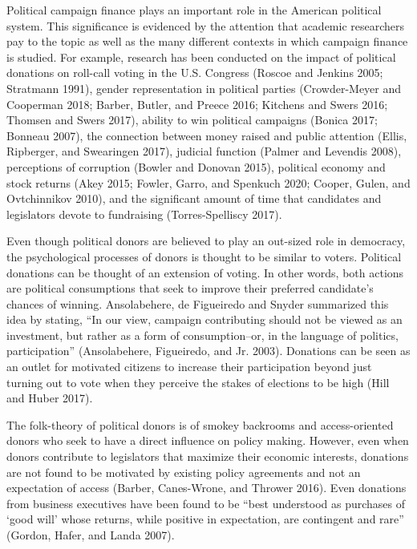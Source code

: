 \documentclass[12pt,]{article}
\begin{document}
\vskip -8.5pt



\noindent \doublespacing 

Political campaign finance plays an important role in the American
political system. This significance is evidenced by the attention that
academic researchers pay to the topic as well as the many different
contexts in which campaign finance is studied. For example, research has
been conducted on the impact of political donations on roll-call voting
in the U.S. Congress (Roscoe and Jenkins 2005; Stratmann 1991), gender
representation in political parties (Crowder-Meyer and Cooperman 2018;
Barber, Butler, and Preece 2016; Kitchens and Swers 2016; Thomsen and
Swers 2017), ability to win political campaigns (Bonica 2017; Bonneau
2007), the connection between money raised and public attention (Ellis,
Ripberger, and Swearingen 2017), judicial function (Palmer and Levendis
2008), perceptions of corruption (Bowler and Donovan 2015), political
economy and stock returns (Akey 2015; Fowler, Garro, and Spenkuch 2020;
Cooper, Gulen, and Ovtchinnikov 2010), and the significant amount of
time that candidates and legislators devote to fundraising
(Torres-Spelliscy 2017).

Even though political donors are believed to play an out-sized role in
democracy, the psychological processes of donors is thought to be
similar to voters. Political donations can be thought of an extension of
voting. In other words, both actions are political consumptions that
seek to improve their preferred candidate's chances of winning.
Ansolabehere, de Figueiredo and Snyder summarized this idea by stating,
``In our view, campaign contributing should not be viewed as an
investment, but rather as a form of consumption--or, in the language of
politics, participation'' (Ansolabehere, Figueiredo, and Jr. 2003).
Donations can be seen as an outlet for motivated citizens to increase
their participation beyond just turning out to vote when they perceive
the stakes of elections to be high (Hill and Huber 2017).

The folk-theory of political donors is of smokey backrooms and
access-oriented donors who seek to have a direct influence on policy
making. However, even when donors contribute to legislators that
maximize their economic interests, donations are not found to be
motivated by existing policy agreements and not an expectation of access
(Barber, Canes-Wrone, and Thrower 2016). Even donations from business
executives have been found to be ``best understood as purchases of `good
will' whose returns, while positive in expectation, are contingent and
rare'' (Gordon, Hafer, and Landa 2007).
\end{document}
